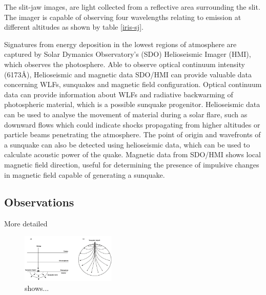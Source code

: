 The slit-jaw images, are light collected from a reflective area surrounding the slit. The imager is capable of observing four wavelengths relating to emission at different altitudes as shown by table \ref{iris-sj}. 


  

Signatures from energy deposition in the lowest regions of atmosphere are captured by Solar Dymanics Observatory's (SDO) Helioseismic Imager (HMI), which observes the photosphere. Able to observe optical continuum intensity (6173Å), Helioseismic and magnetic data SDO/HMI can provide valuable data concerning WLFs, sunquakes and magnetic field configuration. Optical continuum data can provide information about WLFs and radiative backwarming of photospheric material, which is a possible sunquake progenitor. Helioseismic data can be used to analyse the movement of material during a solar flare, such as downward flows which could indicate shocks propagating from higher altitudes or particle beams penetrating the atmosphere. The point of origin and wavefronts of a sunquake can also be detected using helioseismic data, which can be used to calculate acoustic power of the quake. Magnetic data from SDO/HMI shows local magnetic field direction, useful for determining the presence of impulsive changes in magnetic field capable of generating a sunquake.     







\subsection{Observations}
More detailed




\begin{figure}\label{sunquake-cartoon}
  \begin{center}
  \includegraphics[width=0.40\textwidth]{sunquake-cartoon}
  \end{center}
  \caption{shows...}
\end{figure}




